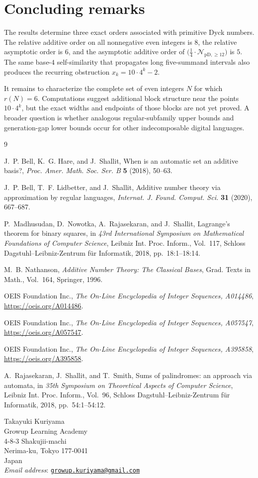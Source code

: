 \documentclass[12pt]{article}
\theoremstyle{plain}
\theoremstyle{definition}
\theoremstyle{plain}
\newcommand{\Pset}{%
  \bigl(\tfrac{1}{4}\cdot\mathcal{N}_{\mathrm{pD},\geq 12}\bigr)%
}
\begin{document}
\section{Concluding remarks}

The results determine three exact orders associated with primitive Dyck
numbers.  The relative additive order on all nonnegative even integers is
$8$, the relative asymptotic order is $6$, and the asymptotic additive order of
$\Pset$ is $5$.  The same base-$4$ self-similarity that propagates long
five-summand intervals also produces the recurring obstruction
$x_k=10\cdot4^k-2$.

It remains to characterize the complete set of even integers $N$ for which
$r(N)=6$.  Computations suggest additional block structure near the points
$10\cdot4^k$, but the exact widths and endpoints of those blocks are not yet
proved.  A broader question is whether analogous regular-subfamily upper
bounds and generation-gap lower bounds occur for other indecomposable digital
languages.

\begin{thebibliography}{9}

J.~P. Bell, K.~G. Hare, and J.~Shallit,
When is an automatic set an additive basis?,
\emph{Proc. Amer. Math. Soc. Ser. B} \textbf{5} (2018), 50--63.

J.~P. Bell, T.~F. Lidbetter, and J.~Shallit,
Additive number theory via approximation by regular languages,
\emph{Internat. J. Found. Comput. Sci.} \textbf{31} (2020), 667--687.

P.~Madhusudan, D.~Nowotka, A.~Rajasekaran, and J.~Shallit,
Lagrange's theorem for binary squares,
in \emph{43rd International Symposium on Mathematical Foundations of
Computer Science}, Leibniz Int. Proc. Inform., Vol.~117, Schloss
Dagstuhl--Leibniz-Zentrum f{\"u}r Informatik, 2018, pp.~18:1--18:14.

M.~B. Nathanson,
\emph{Additive Number Theory: The Classical Bases},
Grad. Texts in Math., Vol.~164, Springer, 1996.

OEIS Foundation Inc.,
\emph{The On-Line Encyclopedia of Integer Sequences, A014486},
\url{https://oeis.org/A014486}.

OEIS Foundation Inc.,
\emph{The On-Line Encyclopedia of Integer Sequences, A057547},
\url{https://oeis.org/A057547}.

OEIS Foundation Inc.,
\emph{The On-Line Encyclopedia of Integer Sequences, A395858},
\url{https://oeis.org/A395858}.

A.~Rajasekaran, J.~Shallit, and T.~Smith,
Sums of palindromes: an approach via automata,
in \emph{35th Symposium on Theoretical Aspects of Computer Science},
Leibniz Int. Proc. Inform., Vol.~96, Schloss Dagstuhl--Leibniz-Zentrum
f{\"u}r Informatik, 2018, pp.~54:1--54:12.

\end{thebibliography}


\begin{flushleft}
Takayuki Kuriyama\\
Growup Learning Academy\\
4-8-3 Shakujii-machi\\
Nerima-ku, Tokyo 177-0041\\
Japan\\
\textit{Email address}: \href{mailto:growup.kuriyama@gmail.com}
{\texttt{growup.kuriyama@gmail.com}}
\end{flushleft}
\end{document}

